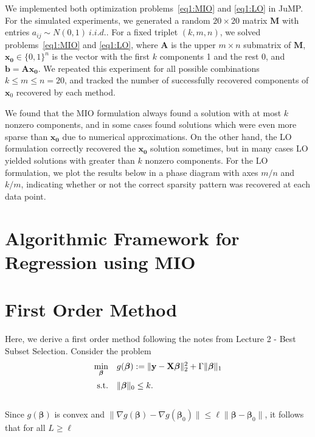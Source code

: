 \documentclass[12pt]{article}
\newcommand{\M}{\mathbf}
\newcommand{\MS}{\boldsymbol}
\newcommand{\1}{\mathds{1}}
\begin{document}
We implemented both optimization problems~\ref{eq1:MIO} and \ref{eq1:LO} in JuMP.  For the simulated experiments, we generated a random $20 \times 20$ matrix $\M M$ with entries $a_{ij} \sim N(0,1)~i.i.d.$.  For a fixed triplet $(k, m, n)$, we solved problems~\ref{eq1:MIO} and \ref{eq1:LO}, where $\M A$ is the upper $m \times n$ submatrix of $\M M$, $\M{x_0} \in \{0,1\}^n$ is the vector with the first $k$ components 1 and the rest 0, and $\M{b = Ax_0}$.   We repeated this experiment for all possible combinations $k \le m \le n = 20$, and tracked the number of successfully recovered components of $\M x_0$ recovered by each method.  

We found that the MIO formulation always found a solution with at most $k$ nonzero components, and in some cases found solutions which were even more sparse than $\M{x_0}$ due to numerical approximations.  On the other hand, the LO formulation correctly recovered the $\M{x_0}$ solution sometimes, but in many cases LO yielded solutions with greater than $k$ nonzero components.  For the LO formulation, we plot the results below in a phase diagram with axes $m/n$ and $k/m$, indicating whether or not the correct sparsity pattern was recovered at each data point.  



\section{Algorithmic Framework for Regression using MIO}



\section{First Order Method}

Here, we derive a first order method following the notes from Lecture 2 - Best Subset Selection.  Consider the problem
\begin{equation}
\begin{array}{rll}
  \min \limits_{\MS \beta} & g(\MS \beta) := \|\M y - \M X \MS \beta \|_2^2 + \Gamma \| \MS \beta \|_1 \vspace{5pt}\\
  \text{s.t.} & \| \MS \beta \|_0 \le k.
\end{array}
\end{equation}\\

Since $g(\MS \beta)$ is convex and $\|\nabla g(\MS \beta) - \nabla g(\MS \beta_0)\| \le \ell \| \MS \beta - \MS \beta_0\|$, it follows that for all $L \ge \ell$
\end{document}
